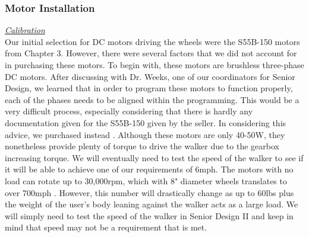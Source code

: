 \subsubsection{Motor Installation}
\noindent \underline{\textit{Calibration}}\\
\noindent Our initial selection for DC motors driving the wheels were the S55B-150 motors from Chapter 3. However, there were several factors that we did not account for in purchasing these motors. To begin with, these motors are brushless three-phase DC motors. After discussing with Dr. Weeks, one of our coordinators for Senior Design, we learned that in order to program these motors to function properly, each of the phases needs to be aligned within the programming. This would be a very difficult process, especially considering that there is hardly any documentation given for the S55B-150 given by the seller. In considering this advice, we purchased instead \cite{amazon12024}. Although these motors are only 40-50W, they nonetheless provide plenty of torque to drive the walker due to the gearbox increasing torque. We will eventually need to test the speed of the walker to see if it will be able to achieve one of our requirements of 6mph. The motors with no load can rotate up to 30,000rpm, which with 8" diameter wheels translates to over 700mph \cite{lucidar2024}. However, this number will drastically change as up to 60lbs plus the weight of the user's body leaning against the walker acts as a large load. We will simply need to test the speed of the walker in Senior Design II and keep in mind that speed may not be a requirement that is met.\\

